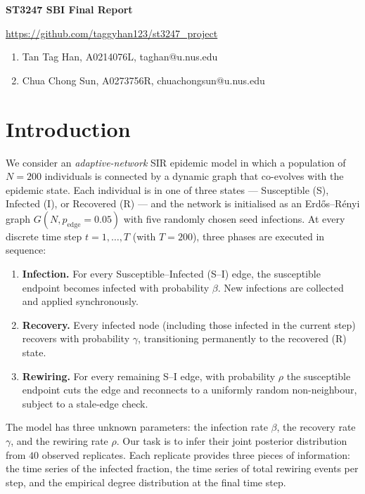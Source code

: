 \documentclass[11pt]{article}
\begin{document}
\begin{center}
    {\huge \textbf{ST3247 SBI Final Report}} \\
    \vspace{0.5cm}
\end{center}

 \href{changes}{https://github.com/taggyhan123/st3247_project}

\begin{enumerate}[nosep, leftmargin=10pt]
\item Tan Tag Han, A0214076L, taghan@u.nus.edu
\item Chua Chong Sun, A0273756R, chuachongsun@u.nus.edu
\end{enumerate}

\section{Introduction}

We consider an \emph{adaptive-network} SIR epidemic model in which a population of $N=200$ individuals is connected by a dynamic graph that co-evolves with the epidemic state. Each individual is in one of three states --- Susceptible (S), Infected (I), or Recovered (R) --- and the network is initialised as an Erd\H{o}s--R\'enyi graph $G(N, p_{\text{edge}}=0.05)$ with five randomly chosen seed infections. At every discrete time step $t = 1,\dots,T$ (with $T=200$), three phases are executed in sequence:

\begin{enumerate}[nosep, leftmargin=10pt]
    \item \textbf{Infection.} For every Susceptible--Infected (S--I) edge, the susceptible endpoint becomes infected with probability $\beta$. New infections are collected and applied synchronously.
    \item \textbf{Recovery.} Every infected node (including those infected in the current step) recovers with probability $\gamma$, transitioning permanently to the recovered (R) state.
    \item \textbf{Rewiring.} For every remaining S--I edge, with probability $\rho$ the susceptible endpoint cuts the edge and reconnects to a uniformly random non-neighbour, subject to a stale-edge check.
\end{enumerate}

The model has three unknown parameters: the infection rate $\beta$, the recovery rate $\gamma$, and the rewiring rate $\rho$. Our task is to infer their joint posterior distribution from $40$ observed replicates. Each replicate provides three pieces of information: the time series of the infected fraction, the time series of total rewiring events per step, and the empirical degree distribution at the final time step.
\end{document}
